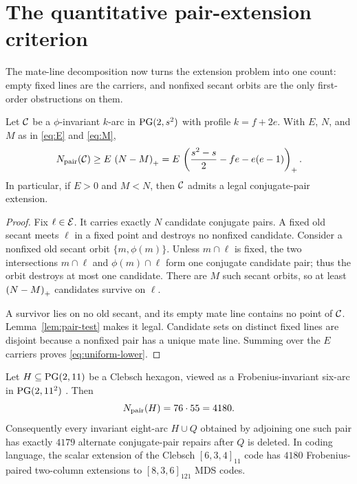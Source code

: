 \section{The quantitative pair-extension criterion}

The mate-line decomposition now turns the extension problem into one count:
empty fixed lines are the carriers, and nonfixed secant orbits are the only
first-order obstructions on them.

\begin{theorem}
\label{thm:pair-criterion}
Let $\mathcal{C}$ be a $\phi$-invariant $k$-arc in $\operatorname{PG}(2,s^2)$ with profile
$k=f+2e$.  With $E$, $N$, and $M$ as in
\eqref{eq:E} and \eqref{eq:M},
\begin{equation}\label{eq:uniform-lower}
  N_{\mathrm{pair}}(\mathcal{C})\ge E\,\left(N-M\right)_{+}
  =E\,\left(\frac{s^2-s}{2}-fe-e(e-1)\right)_{+}.
\end{equation}
In particular, if $E>0$ and $M<N$, then $\mathcal{C}$ admits a legal conjugate-pair
extension.
\end{theorem}

\begin{proof}
Fix $\ell\in\mathcal{E}$.  It carries exactly $N$ candidate conjugate pairs.  A
fixed old secant meets $\ell$ in a fixed point and destroys no nonfixed
candidate.  Consider a nonfixed old secant orbit $\{m,\phi(m)\}$.  Unless
$m\cap\ell$ is fixed, the two intersections $m\cap\ell$ and
$\phi(m)\cap\ell$ form one conjugate candidate pair; thus the orbit destroys
at most one candidate.  There are $M$ such secant orbits, so at least
$\left(N-M\right)_{+}$ candidates survive on $\ell$.

A survivor lies on no old secant, and its empty mate line contains no point
of $\mathcal{C}$.  Lemma~\ref{lem:pair-test} makes it legal.  Candidate sets on
distinct fixed lines are disjoint because a nonfixed pair has a unique mate
line.  Summing over the $E$ carriers proves \eqref{eq:uniform-lower}.
\end{proof}

\begin{corollary}
\label{cor:clebsch-pair-extension}
Let $H\subseteq\operatorname{PG}(2,11)$ be a Clebsch hexagon, viewed as a
Frobenius-invariant six-arc in $\operatorname{PG}(2,11^2)$
\cite{RuddClebschRigidity2026}.  Then
\[
  N_{\mathrm{pair}}(H)=76\cdot55=4180.
\]
Consequently every invariant eight-arc $H\cup Q$ obtained by adjoining one
such pair has exactly $4179$ alternate conjugate-pair repairs after $Q$ is
deleted.  In coding language, the scalar extension of the Clebsch
$[6,3,4]_{11}$ code has $4180$ Frobenius-paired two-column extensions to
$[8,3,6]_{121}$ MDS codes.
\end{corollary}

